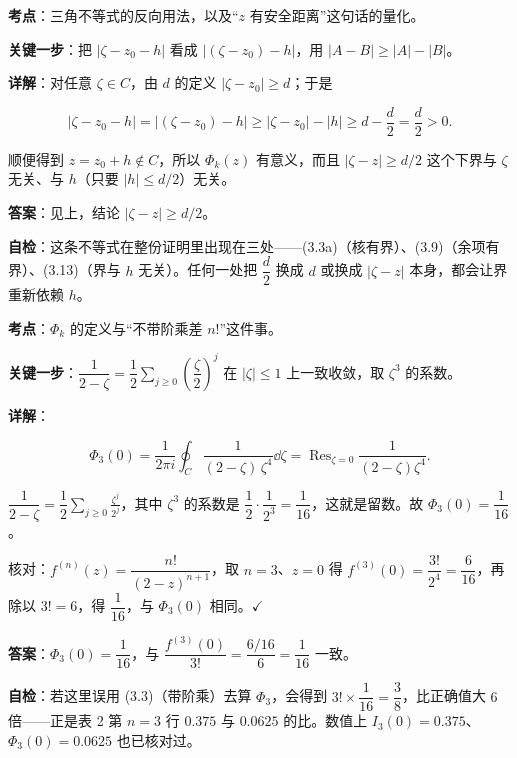 \documentclass[11pt]{ctexart}
\renewcommand{\qbreak}{\needspace{0.45\textheight}}
\let\origsubhdr\subhdr
\renewcommand{\subhdr}[1]{\par\origsubhdr{#1}}
\begin{document}
\qbreak
{}


\noindent\textbf{考点}：三角不等式的反向用法，以及“$z$ 有安全距离”这句话的量化。

\noindent\textbf{关键一步}：把 $|\zeta-z_0-h|$ 看成 $|(\zeta-z_0)-h|$，用 $|A-B|\ge|A|-|B|$。

\noindent\textbf{详解}：对任意 $\zeta\in C$，由 $d$ 的定义 $|\zeta-z_0|\ge d$；于是

\begin{equation*}
|\zeta-z_0-h|=|(\zeta-z_0)-h|\ge|\zeta-z_0|-|h|\ge d-\frac{d}{2}=\frac{d}{2}>0 .
\end{equation*}

顺便得到 $z=z_0+h\notin C$，所以 $\Phi_k(z)$ 有意义，而且 $|\zeta-z|\ge d/2$ 这个下界与 $\zeta$ 无关、与 $h$（只要 $|h|\le d/2$）无关。

\noindent\textbf{答案}：见上，结论 $|\zeta-z|\ge d/2$。

\noindent\textbf{自检}：这条不等式在整份证明里出现在三处——(3.3a)（核有界）、(3.9)（余项有界）、(3.13)（界与 $h$ 无关）。任何一处把 $\dfrac{d}{2}$ 换成 $d$ 或换成 $|\zeta-z|$ 本身，都会让界重新依赖 $h$。

\qbreak
{}


\noindent\textbf{考点}：$\Phi_k$ 的定义与“不带阶乘差 $n!$”这件事。

\noindent\textbf{关键一步}：$\dfrac{1}{2-\zeta}=\dfrac12\sum_{j\ge0}\left(\dfrac{\zeta}{2}\right)^{j}$ 在 $|\zeta|\le1$ 上一致收敛，取 $\zeta^{3}$ 的系数。

\noindent\textbf{详解}：

\begin{equation*}
\Phi_3(0)=\frac{1}{2\pi i}\oint_C\frac{1}{(2-\zeta)\,\zeta^{4}}\dd\zeta=\operatorname{Res}_{\zeta=0}\frac{1}{(2-\zeta)\zeta^{4}} .
\end{equation*}

$\dfrac{1}{2-\zeta}=\dfrac12\displaystyle\sum_{j\ge0}\frac{\zeta^{j}}{2^{j}}$，其中 $\zeta^{3}$ 的系数是 $\dfrac{1}{2}\cdot\dfrac{1}{2^{3}}=\dfrac{1}{16}$，这就是留数。故 $\Phi_3(0)=\dfrac{1}{16}$。

核对：$f^{(n)}(z)=\dfrac{n!}{(2-z)^{n+1}}$，取 $n=3$、$z=0$ 得 $f^{(3)}(0)=\dfrac{3!}{2^{4}}=\dfrac{6}{16}$，再除以 $3!=6$，得 $\dfrac{1}{16}$，与 $\Phi_3(0)$ 相同。$\checkmark$

\noindent\textbf{答案}：$\Phi_3(0)=\dfrac{1}{16}$，与 $\dfrac{f^{(3)}(0)}{3!}=\dfrac{6/16}{6}=\dfrac{1}{16}$ 一致。

\noindent\textbf{自检}：若这里误用 (3.3)（带阶乘）去算 $\Phi_3$，会得到 $3!\times\dfrac{1}{16}=\dfrac38$，比正确值大 $6$ 倍——正是表 2 第 $n=3$ 行 $0.375$ 与 $0.0625$ 的比。数值上 $I_3(0)=0.375$、$\Phi_3(0)=0.0625$ 也已核对过。
\end{document}
